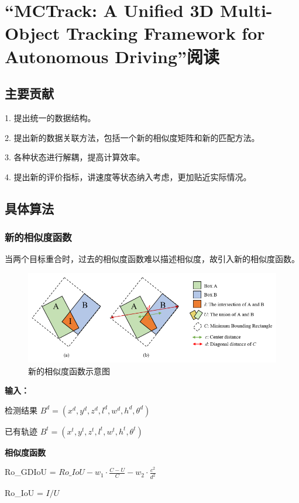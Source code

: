 \chapter{“MCTrack: A Unified 3D Multi-Object Tracking Framework for Autonomous  Driving”\cite{wang2024mctrack}阅读}
\section{主要贡献}
1. 提出统一的数据结构。

2. 提出新的数据关联方法，包括一个新的相似度矩阵和新的匹配方法。

3. 各种状态进行解耦，提高计算效率。

4. 提出新的评价指标，讲速度等状态纳入考虑，更加贴近实际情况。

\section{具体算法}
\subsection{新的相似度函数}
当两个目标重合时，过去的相似度函数难以描述相似度，故引入新的相似度函数。
\begin{figure}
	\centering
	\includegraphics{images/241209/iou.png}
	\caption{新的相似度函数示意图}
\end{figure}

\begin{tcolorbox}
	\textbf{输入：}
	
		\hspace{8em}检测结果	$ B^d=(x^d, y^d,z^d,l^d,w^d,h^d,{\theta}^d) $
		
		\hspace{8em}已有轨迹	$ B^t=(x^t, y^t,z^t,l^t,w^t,h^t,{\theta}^t) $
	
	\textbf{相似度函数}
	
		\hspace{8em}Ro\_GDIoU = $Ro\_IoU - w_1 \cdot \frac{C-U}{C} - w_2 \cdot \frac{c^2}{d^2}$
		
		\hspace{9.5em}Ro\_IoU = $I/U$
		

\end{tcolorbox}

